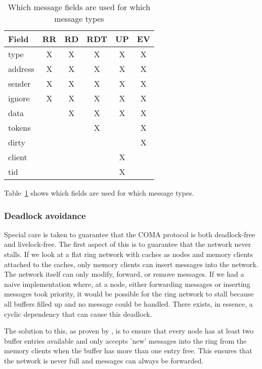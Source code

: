\begin{table}
\begin{center}
\begin{tabular}{|l|c|c|c|c|c|}
\hline
Field & RR & RD & RDT & UP & EV\\
\hline
type    & X & X & X & X & X \\
address & X & X & X & X & X \\
sender  & X & X & X & X & X \\
ignore  & X & X & X & X & X \\
data    &   & X & X & X & X \\
tokens  &   &   & X &   & X \\
dirty   &   &   &   &   & X \\
client  &   &   &   & X &   \\
tid     &   &   &   & X &   \\
\hline
\end{tabular}
\caption{Which message fields are used for which message types}
\label{table:message_contents_usage}
\end{center}
\end{table}

Table~\ref{table:message_contents_usage} shows which fields are used for which message types.

\subsubsection{Deadlock avoidance}
Special care is taken to guarantee that the COMA protocol is both deadlock-free and livelock-free. The first aspect of this is to guarantee that the network never stalls. If we look at a flat ring network with caches as nodes and memory clients attached to the caches, only memory clients can insert messages into the network. The network itself can only modify, forward, or remove messages. If we had a naive implementation where, at a node, either forwarding messages or inserting messages took priority, it would be possible for the ring network to stall because all buffers filled up and no message could be handled. There exists, in essence, a cyclic dependency that can cause this deadlock.

The solution to this, as proven by \cite{Brookes}, is to ensure that every node has at least two buffer entries available and only accepts 'new' messages into the ring from the memory clients when the buffer has more than one entry free. This ensures that the network is never full and messages can always be forwarded.

